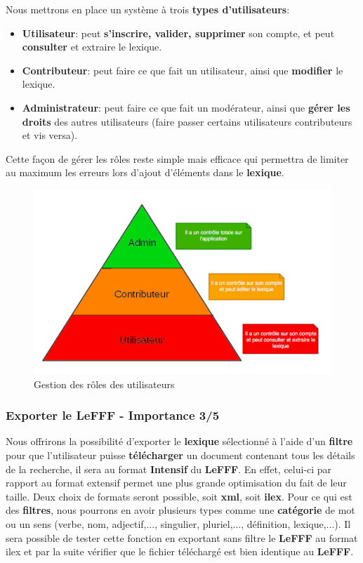 {Nous mettrons en place un système à trois \textbf{types d'utilisateurs}:
\begin{itemize}
\item \textbf{Utilisateur}: peut \textbf{s'inscrire, valider, supprimer} son compte, et peut \textbf{consulter} et extraire le lexique.
\item \textbf{Contributeur}: peut faire ce que fait un utilisateur, ainsi que  \textbf{modifier} le lexique.
\item \textbf{Administrateur}: peut faire ce que fait un modérateur, ainsi que \textbf{gérer les droits} des autres utilisateurs (faire passer certains utilisateurs contributeurs et vis versa).
\end{itemize}
{Cette façon de gérer les rôles reste simple mais efficace qui permettra de limiter au maximum les erreurs lors d'ajout d'éléments dans le \textbf{lexique}.\par}

\begin{figure}[ht]
    \centering
    \includegraphics[scale=0.5]{role.png}
    \caption{Gestion des rôles des utilisateurs }
\end{figure}
\newpage
    


\subsubsection{Exporter le LeFFF - Importance 3/5}

{Nous offrirons la possibilité d'exporter le \textbf{lexique} sélectionné à l'aide d'un \textbf{filtre} pour que l'utilisateur puisse \textbf{télécharger} un document contenant tous les détails de la recherche, il sera au format \textbf{Intensif} du \textbf{LeFFF}. En effet, celui-ci par rapport au format extensif permet une plus grande optimisation du fait de leur taille. Deux choix de formats seront possible, soit \textbf{xml}, soit \textbf{ilex}. Pour ce qui est des \textbf{filtres}, nous pourrons en avoir plusieurs types comme une \textbf{catégorie} de mot ou un sens (verbe, nom, adjectif,..., singulier, pluriel,..., définition, lexique,...). Il sera possible de tester cette fonction en exportant sans filtre le \textbf{LeFFF} au format ilex et par la suite vérifier que le fichier téléchargé est bien identique au \textbf{LeFFF}.\par}

}
